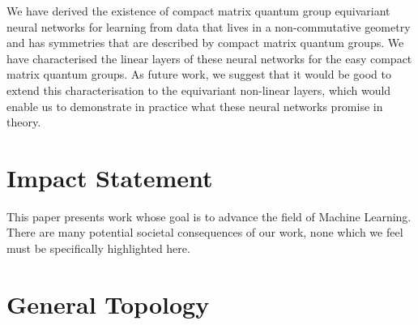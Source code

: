 \documentclass{article}
\theoremstyle{plain}
\theoremstyle{definition}
\theoremstyle{remark}
\begin{document}
We have derived the existence of compact matrix quantum group equivariant
neural networks for learning from data that lives in a non-commutative geometry
and has 
symmetries that are described by compact matrix
quantum groups. We have characterised the linear layers of these neural networks
for the easy compact matrix quantum groups. As future work, we suggest that it 
would be good to extend this characterisation to the equivariant non-linear layers,
which would enable us to demonstrate in practice what these neural networks 
promise in theory.







\section*{Impact Statement}

This paper presents work whose goal is to advance the field of 
Machine Learning. There are many potential societal consequences 
of our work, none which we feel must be specifically highlighted here.





\nocite{*}




\newpage
\appendix
\onecolumn

\section{General Topology} \label{gentopology}
\end{document}
